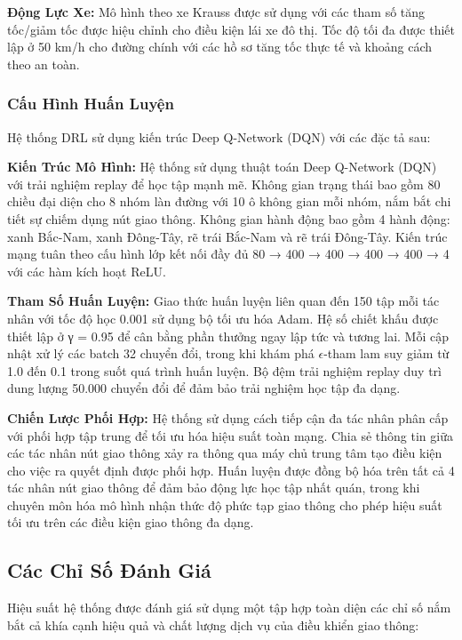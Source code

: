 \textbf{Động Lực Xe:} Mô hình theo xe Krauss được sử dụng với các tham số tăng tốc/giảm tốc được hiệu chỉnh 
cho điều kiện lái xe đô thị. Tốc độ tối đa được thiết lập ở 50 km/h cho đường chính với các hồ sơ tăng tốc 
thực tế và khoảng cách theo an toàn.

\subsubsection{Cấu Hình Huấn Luyện}

Hệ thống DRL sử dụng kiến trúc Deep Q-Network (DQN) với các đặc tả sau:

\textbf{Kiến Trúc Mô Hình:} Hệ thống sử dụng thuật toán Deep Q-Network (DQN) với trải nghiệm replay 
để học tập mạnh mẽ. Không gian trạng thái bao gồm 80 chiều đại diện cho 8 nhóm làn đường với 10 ô 
không gian mỗi nhóm, nắm bắt chi tiết sự chiếm dụng nút giao thông. Không gian hành động bao gồm 4 hành động: 
xanh Bắc-Nam, xanh Đông-Tây, rẽ trái Bắc-Nam và rẽ trái Đông-Tây. Kiến trúc mạng tuân theo cấu hình lớp 
kết nối đầy đủ 80 → 400 → 400 → 400 → 400 → 4 với các hàm kích hoạt ReLU.

\textbf{Tham Số Huấn Luyện:} Giao thức huấn luyện liên quan đến 150 tập mỗi tác nhân với tốc độ học 0.001 
sử dụng bộ tối ưu hóa Adam. Hệ số chiết khấu được thiết lập ở γ = 0.95 để cân bằng phần thưởng ngay lập tức 
và tương lai. Mỗi cập nhật xử lý các batch 32 chuyển đổi, trong khi khám phá $\epsilon$-tham lam suy giảm 
từ 1.0 đến 0.1 trong suốt quá trình huấn luyện. Bộ đệm trải nghiệm replay duy trì dung lượng 50.000 chuyển đổi 
để đảm bảo trải nghiệm học tập đa dạng.

\textbf{Chiến Lược Phối Hợp:} Hệ thống sử dụng cách tiếp cận đa tác nhân phân cấp với phối hợp tập trung 
để tối ưu hóa hiệu suất toàn mạng. Chia sẻ thông tin giữa các tác nhân nút giao thông xảy ra thông qua 
máy chủ trung tâm tạo điều kiện cho việc ra quyết định được phối hợp. Huấn luyện được đồng bộ hóa trên tất cả 
4 tác nhân nút giao thông để đảm bảo động lực học tập nhất quán, trong khi chuyên môn hóa mô hình nhận thức 
độ phức tạp giao thông cho phép hiệu suất tối ưu trên các điều kiện giao thông đa dạng.

\subsection{Các Chỉ Số Đánh Giá}\label{subsec2b-2}

Hiệu suất hệ thống được đánh giá sử dụng một tập hợp toàn diện các chỉ số nắm bắt cả khía cạnh hiệu quả 
và chất lượng dịch vụ của điều khiển giao thông:

